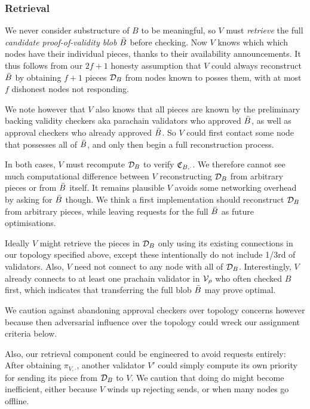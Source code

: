 \subsubsection{Retrieval}
\label{sec:retrieval}

We never consider substructure of $B$ to be meaningful, so $V$ must {\em retrieve} the full {\em candidate proof-of-validity blob} $\bar{B}$ before checking.  Now $V$ knows which which nodes have their individual pieces, thanks to their availability announcements.  It thus follows from our $2f+1$ honesty assumption that $V$ could always reconstruct $\bar{B}$ by obtaining $f+1$ pieces $\mathcal{D}_B$ from nodes known to posses them, with at most $f$ dishonest nodes not responding.  

We note however that $V$ also knows that all pieces are known by the preliminary backing validity checkers aka parachain validators who approved $\bar{B}$, as well as approval checkers who already approved $\bar{B}$.  So $V$ could first contact some node that possesses all of $\bar{B}$, and only then begin a full reconstruction process. 

In both cases, $V$ must recompute $\mathcal{D}_B$ to verify $\mathfrak{C}_{B,\cdot}$.  We therefore cannot see much computational difference between $V$ reconstructing $\mathcal{D}_B$ from arbitrary pieces or from $\bar{B}$ itself.  It remains plausible $V$ avoids some networking overhead by asking for $\bar{B}$ though.  We think a first implementation should reconstruct $\mathcal{D}_B$ from arbitrary pieces, while leaving requests for the full $\bar{B}$ as future optimisations. 

Ideally $V$ might retrieve the pieces in $\mathcal{D}_B$ only using its existing connections in our topology specified above, except these intentionally do not include 1/3rd of validators.  Also, $V$ need not connect to any node with all of $\mathcal{D}_B$. 
Interestingly, $V$ already connects to at least one prachain validator in $\mathcal{V}_\rho$ who often checked $B$ first, which indicates that transferring the full blob $\bar{B}$ may prove optimal.  

We caution against abandoning approval checkers over topology concerns however because then adversarial influence over the topology could wreck our assignment criteria below.

Also, our retrieval component could be engineered to avoid requests entirely:  After obtaining $\pi_{V,\cdot}$, another validator $V'$ could simply compute its own priority for sending its piece from $\mathcal{D}_B$ to $V$.  We caution that doing do might become inefficient, either because $V$ winds up rejecting sends, or when many nodes go offline.  

